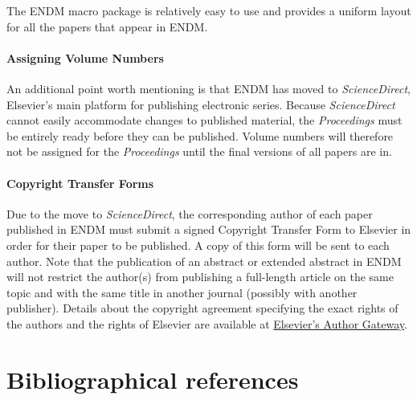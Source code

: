 \documentclass{endm}
\begin{document}
The ENDM macro package is relatively easy to use and provides a
uniform layout for all the papers that appear in ENDM.

\paragraph{Assigning Volume Numbers}

An additional point worth mentioning is that ENDM has moved to
\emph{ScienceDirect}, Elsevier's main platform for publishing
electronic series. Because \emph{ScienceDirect} cannot easily
accommodate changes to published material, the \emph{Proceedings}
must be entirely ready before they can be published. Volume numbers
will therefore not be assigned for the \emph{Proceedings} until the
final versions of all papers are in.

\paragraph{Copyright Transfer Forms}

Due to the move to \emph{ScienceDirect}, the corresponding author of
each paper published in ENDM must submit a signed Copyright Transfer
Form to Elsevier in order for their paper to be published. A copy of
this form will be sent to each author. Note that the publication of
an abstract or extended abstract in ENDM will not restrict the
author(s) from publishing a full-length article on the same topic and
with the same title in another journal (possibly with another
publisher). Details about the copyright agreement specifying the exact
rights of the authors and the rights of Elsevier are available at
\href{http://authors.elsevier.com/PublisherInfoDetail.html?dc=AGI}
{Elsevier's Author Gateway}.


\section{Bibliographical references}\label{references}
\end{document}
